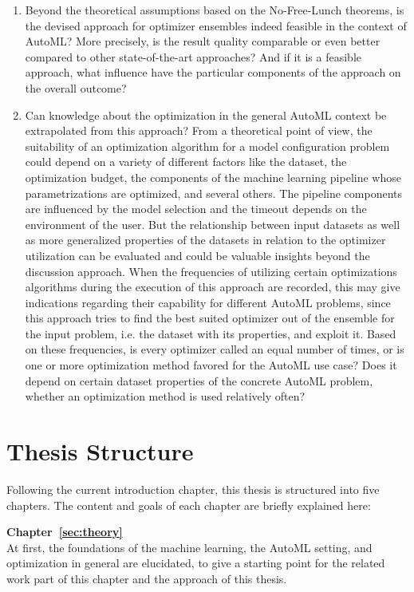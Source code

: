 \begin{enumerate}
    \item Beyond the theoretical assumptions based on the No-Free-Lunch theorems, is the devised approach for optimizer ensembles indeed feasible in the context of AutoML?
    More precisely, is the result quality comparable or even better compared to other state-of-the-art approaches?
    And if it is a feasible approach, what influence have the particular components of the approach on the overall outcome?
    \item Can knowledge about the optimization in the general AutoML context be extrapolated from this approach?
    From a theoretical point of view, the suitability of an optimization algorithm for a model configuration problem could depend on a variety of different factors like the dataset, the optimization budget, the components of the machine learning pipeline whose parametrizations are optimized, and several others.
    The pipeline components are influenced by the model selection and the timeout depends on the environment of the user.
    But the relationship between input datasets as well as more generalized properties of the datasets in relation to the optimizer utilization can be evaluated and could be valuable insights beyond the discussion approach.\newline
    When the frequencies of utilizing certain optimizations algorithms during the execution of this approach are recorded, this may give indications regarding their capability for different AutoML problems, since this approach tries to find the best suited optimizer out of the ensemble for the input problem, i.e. the dataset with its properties, and exploit it.
    Based on these frequencies, is every optimizer called an equal number of times, or is one or more optimization method favored for the AutoML use case?
    Does it depend on certain dataset properties of the concrete AutoML problem, whether an optimization method is used relatively often?
\end{enumerate}

\section{Thesis Structure}
\label{sec:intro:structure}
Following the current introduction chapter, this thesis is structured into five chapters.
The content and goals of each chapter are briefly explained here:

\textbf{Chapter~\ref{sec:theory}} \\[0.2em]
At first, the foundations of the machine learning, the AutoML setting, and optimization in general are elucidated, to give a starting point for the related work part of this chapter and the approach of this thesis.

